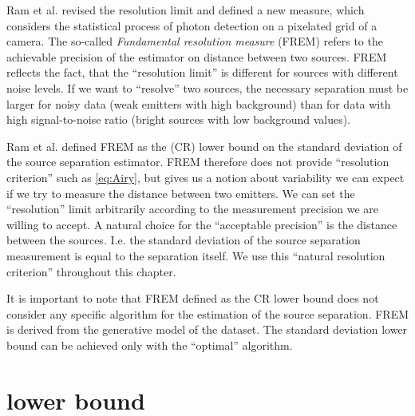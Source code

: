 Ram et al. \cite{Ram2006,Ram2006b} revised the resolution limit and defined a new measure, which considers the statistical process of photon detection on a pixelated grid of a camera. The so-called \emph{Fundamental resolution measure} (FREM) refers to the achievable precision of the estimator on distance between two sources. FREM reflects the fact, that the ``resolution limit'' is different for sources with different noise levels. If we want to ``resolve'' two sources, the necessary separation must be larger for noisy data (weak emitters with high background) than for data with high signal-to-noise ratio (bright sources with low background values).

Ram et al. defined FREM as the \CR (CR) lower bound on the standard deviation of the source separation estimator. FREM therefore does not provide ``resolution criterion'' such as \autoref{eq:Airy}, but gives us a notion about variability we can expect if we try to measure the distance between two emitters. We can set the ``resolution'' limit arbitrarily according to the measurement precision we are willing to accept. A natural choice for the ``acceptable precision'' is the distance between the sources. I.e. the standard deviation of the source separation measurement is equal to the separation itself. We use this ``natural resolution criterion'' throughout this chapter. 

It is important to note that FREM defined as the CR lower bound does not consider any specific algorithm for the estimation of the source separation. FREM is derived from the generative model of the dataset.  The standard deviation lower bound can be achieved only with the ``optimal'' algorithm. 




\section{\CR lower bound\label{sec:CR}}

